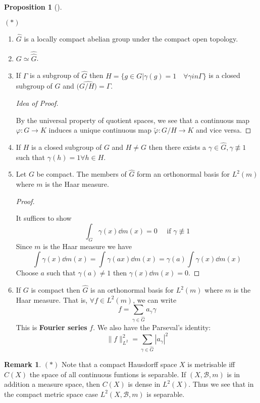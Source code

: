 \documentclass{article}
\theoremstyle{definition}
\newtheorem{rem}{Remark}
\newtheorem{prop}{Proposition}
\newenvironment{proofs}[1][\proofname]{%
  \begin{proof}[#1]$ $\par\nobreak\ignorespaces
}{%
  \end{proof}
}
\newenvironment{props}[1][]{%
  \begin{prop}[#1]$ $\par\nobreak\ignorespaces
}{%
  \end{prop}
}
\begin{document}
\begin{props}
	$(*)$
	\begin{enumerate}
		\item $\widehat{G}$ is a locally compact abelian group under the compact open topology.

		\item $G \simeq \widehat{\widehat{G}}$.

		\item If $\Gamma$ is a subgroup of $\widehat{G}$ then $H = \{g \in G| \gamma(g) = 1 \quad \forall \gamma in \Gamma \}$ is a closed subgroup of $G$ and $(\widehat{G/H)} = \Gamma$.

			\begin{proofs}[Idea of Proof]
				By the universal property of quotient spaces, we see that a continuous map $\varphi: G \to K$ induces a unique continuous map $\tilde{\varphi}: G/H \to K$ and vice versa.
			\end{proofs}

		\item If $H$ is a closed subgroup of $G$ and $H \neq G$ then there exists a $\gamma \in \widehat{G}, \gamma \not\equiv 1$ such that $\gamma(h) = 1 \forall h \in H$.

		\item Let $G$ be compact.
			The members of $\widehat{G}$ form an orthonormal basis for $L^2(m)$ where $m$ is the Haar measure.

			\begin{proofs}[Proof]
				It suffices to show 
				\[
					\int_G \gamma(x) \dd{m}(x) = 0 \quad \text{ if }\gamma \not\equiv 1
				\]
				Since $m$ is the Haar measure we have
				\[
					\int \gamma(x) \dd{m}(x) = \int \gamma(ax) \dd{m}(x) = \gamma(a) \int \gamma(x) \dd{m}(x)
				\]
				Choose $a$ such that $\gamma(a) \neq 1$ then $\gamma(x) \dd{m}(x) = 0$.
			\end{proofs}

		\item If $G$ is compact then $\widehat{G}$ is an orthonormal basis for $L^2(m)$ where $m$ is the Haar measure.
			That is, $\forall f \in L^2(m)$, we can write
			\[
				f = \sum_{\gamma \in \widehat{G}} a_\gamma \gamma
			\]
			This is \textbf{Fourier series} $f$.
			We also have the Parseval's identity:
			\[
				\|f\|_{L^2}^2 = \sum_{\gamma \in \widehat{G}}|a_\gamma|^2
			\]

	\end{enumerate}
\end{props}

\begin{rem}
	$(*)$
	Note that a compact Hausdorff space $X$ is metrisable iff $C(X)$ the space of all continuous funtions is separable.
	If $(X, \mathscr{B}, m)$ is in addition a measure space, then $C(X)$ is dense in $L^2(X)$.
	Thus we see that in the compact metric space case $L^2(X, \mathscr{B}, m)$ is separable.
\end{rem}
\end{document}
